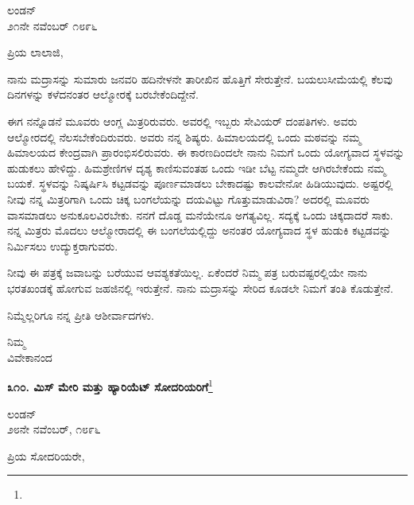 \begin{flushright}
ಲಂಡನ್\\೨೧ನೇ ನವೆಂಬರ್ ೧೮೯೬
\end{flushright}

\noindent
ಪ್ರಿಯ ಲಾಲಾಜಿ,

\vspace{0.15cm}

ನಾನು ಮದ್ರಾಸನ್ನು ಸುಮಾರು ಜನವರಿ ಹದಿನೇಳನೇ ತಾರೀಖಿನ ಹೊತ್ತಿಗೆ ಸೇರುತ್ತೇನೆ. ಬಯಲುಸೀಮೆಯಲ್ಲಿ ಕೆಲವು ದಿನಗಳನ್ನು ಕಳೆದನಂತರ ಆಲ್ಮೋರಕ್ಕೆ ಬರಬೇಕೆಂದಿದ್ದೇನೆ.

\vspace{0.15cm}

ಈಗ ನನ್ನೊಡನೆ ಮೂವರು ಆಂಗ್ಲ ಮಿತ್ರರಿರುವರು. ಅವರಲ್ಲಿ ಇಬ್ಬರು ಸೇವಿಯರ್ ದಂಪತಿಗಳು. ಅವರು ಆಲ್ಮೋರದಲ್ಲಿ ನೆಲಸಬೇಕೆಂದಿರುವರು. ಅವರು ನನ್ನ ಶಿಷ್ಯರು. ಹಿಮಾಲಯದಲ್ಲಿ ಒಂದು ಮಠವನ್ನು ನಮ್ಮ ಹಿಮಾಲಯದ ಕೇಂದ್ರವಾಗಿ ಪ್ರಾರಂಭಿಸಲಿರುವರು. ಈ ಕಾರಣದಿಂದಲೇ ನಾನು ನಿಮಗೆ ಒಂದು ಯೋಗ್ಯವಾದ ಸ್ಥಳವನ್ನು ಹುಡುಕಲು ಹೇಳಿದ್ದು. ಹಿಮಶ್ರೇಣಿಗಳ ದೃಶ್ಯ ಕಾಣಿಸುವಂತಹ ಒಂದು ಇಡೀ ಬೆಟ್ಟ ನಮ್ಮದೇ ಆಗಿರಬೇಕೆಂದು ನಮ್ಮ ಬಯಕೆ. ಸ್ಥಳವನ್ನು ನಿಷ್ಕರ್ಷಿಸಿ ಕಟ್ಟಡವನ್ನು ಪೂರ್ಣಮಾಡಲು ಬೇಕಾದಷ್ಟು ಕಾಲವೇನೋ ಹಿಡಿಯುವುದು. ಅಷ್ಟರಲ್ಲಿ ನೀವು ನನ್ನ ಮಿತ್ರರಿಗಾಗಿ ಒಂದು ಚಿಕ್ಕ ಬಂಗಲೆಯನ್ನು ದಯವಿಟ್ಟು ಗೊತ್ತುಮಾಡುವಿರಾ? ಅದರಲ್ಲಿ ಮೂವರು ವಾಸಮಾಡಲು ಅನುಕೂಲವಿರಬೇಕು. ನನಗೆ ದೊಡ್ಡ ಮನೆಯೇನೂ ಅಗತ್ಯವಿಲ್ಲ. ಸದ್ಯಕ್ಕೆ ಒಂದು ಚಿಕ್ಕದಾದರೆ ಸಾಕು. ನನ್ನ ಮಿತ್ರರು ಮೊದಲು ಆಲ್ಮೋರಾದಲ್ಲಿ ಈ ಬಂಗಲೆಯಲ್ಲಿದ್ದು ಅನಂತರ ಯೋಗ್ಯವಾದ ಸ್ಥಳ ಹುಡುಕಿ ಕಟ್ಟಡವನ್ನು ನಿರ್ಮಿಸಲು ಉದ್ಯುಕ್ತರಾಗುವರು.

\vspace{0.15cm}

ನೀವು ಈ ಪತ್ರಕ್ಕೆ ಜವಾಬನ್ನು ಬರೆಯುವ ಆವಶ್ಯಕತೆಯಿಲ್ಲ. ಏಕೆಂದರೆ ನಿಮ್ಮ ಪತ್ರ ಬರುವಷ್ಟರಲ್ಲಿಯೇ ನಾನು ಭರತಖಂಡಕ್ಕೆ ಹೋಗುವ ಜಹಜಿನಲ್ಲಿ ಇರುತ್ತೇನೆ. ನಾನು ಮದ್ರಾಸನ್ನು ಸೇರಿದ ಕೂಡಲೇ ನಿಮಗೆ ತಂತಿ ಕೊಡುತ್ತೇನೆ.

\vspace{0.15cm}

ನಿಮ್ಮೆಲ್ಲರಿಗೂ ನನ್ನ ಪ್ರೀತಿ ಆಶೀರ್ವಾದಗಳು.

{\flushright
ನಿಮ್ಮ\\ವಿವೇಕಾನಂದ\par}

\begin{center}
\textbf{೩೧೦. ಮಿಸ್ ಮೇರಿ ಮತ್ತು ಹ್ಯಾರಿಯೆಟ್ ಸೋದರಿಯರಿಗೆ}\footnote{}
\end{center}

\begin{flushright}
ಲಂಡನ್\\೨೮ನೇ ನವೆಂಬರ್, ೧೮೯೬
\end{flushright}

\noindent
ಪ್ರಿಯ ಸೋದರಿಯರೇ,

